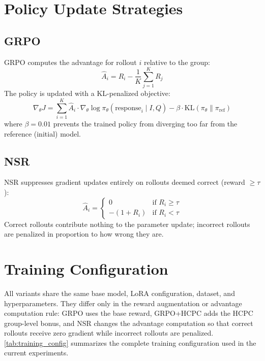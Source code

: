 \documentclass{iutbscthesis}
\begin{document}
\section{Policy Update Strategies}

\subsection{GRPO}

GRPO computes the advantage for rollout $i$ relative to the group:
\begin{equation}
    \hat{A}_i = R_i - \frac{1}{K} \sum_{j=1}^{K} R_j
\end{equation}
The policy is updated with a KL-penalized objective:
\begin{equation}
    \nabla_\theta J = \sum_{i=1}^{K} \hat{A}_i \cdot \nabla_\theta \log \pi_\theta(\text{response}_i \mid I, Q) - \beta \cdot \mathrm{KL}(\pi_\theta \| \pi_{\text{ref}})
\end{equation}
where $\beta = 0.01$ prevents the trained policy from diverging too far from the reference (initial) model.

\subsection{NSR}

NSR suppresses gradient updates entirely on rollouts deemed correct (reward $\geq \tau$):
\begin{equation}
    \hat{A}_i = \begin{cases} 0 & \text{if } R_i \geq \tau \\ -(1 + R_i) & \text{if } R_i < \tau \end{cases}
\end{equation}
Correct rollouts contribute nothing to the parameter update; incorrect rollouts are penalized in proportion to how wrong they are.

\section{Training Configuration}

All variants share the same base model, LoRA configuration, dataset, and hyperparameters. They differ only in the reward augmentation or advantage computation rule: GRPO uses the base reward, GRPO+HCPC adds the HCPC group-level bonus, and NSR changes the advantage computation so that correct rollouts receive zero gradient while incorrect rollouts are penalized. \autoref{tab:training_config} summarizes the complete training configuration used in the current experiments.
\end{document}
